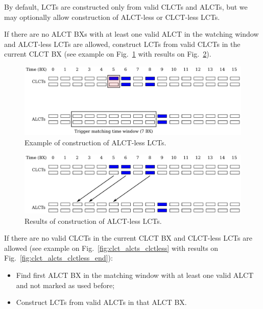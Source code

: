 By default, LCTs are constructed only from valid CLCTs and ALCTs, but we may optionally allow construction of ALCT-less or CLCT-less LCTs.

If there are no ALCT BXs with at least one valid ALCT in the watching window and ALCT-less LCTs are allowed, construct LCTs from valid CLCTs in the current CLCT BX (see example on Fig.~\ref{fig:clct_alcts_alctless} with results on Fig.~\ref{fig:clct_alcts_alctless_end}).

\begin{figure}[tbh]
        \begin{center}
                \includegraphics[width=0.7\linewidth]{figures/clct_alcts_alctless.pdf}
                \caption{Example of construction of ALCT-less LCTs.}
                \label{fig:clct_alcts_alctless}
        \end{center}
\end{figure}

\begin{figure}[tbh]
        \begin{center}
                \includegraphics[width=0.7\linewidth]{figures/clct_alcts_alctless_end.pdf}
                \caption{Results of construction of ALCT-less LCTs.}
                \label{fig:clct_alcts_alctless_end}
        \end{center}
\end{figure}

If there are no valid CLCTs in the current CLCT BX and CLCT-less LCTs are allowed (see example on Fig.~\ref{fig:clct_alcts_clctless} with results on Fig.~\ref{fig:clct_alcts_clctless_end}):
\begin{itemize}
    \item Find first ALCT BX in the matching window with at least one valid ALCT and not marked as used before;
    \item Construct LCTs from valid ALCTs in that ALCT BX.
\end{itemize}


